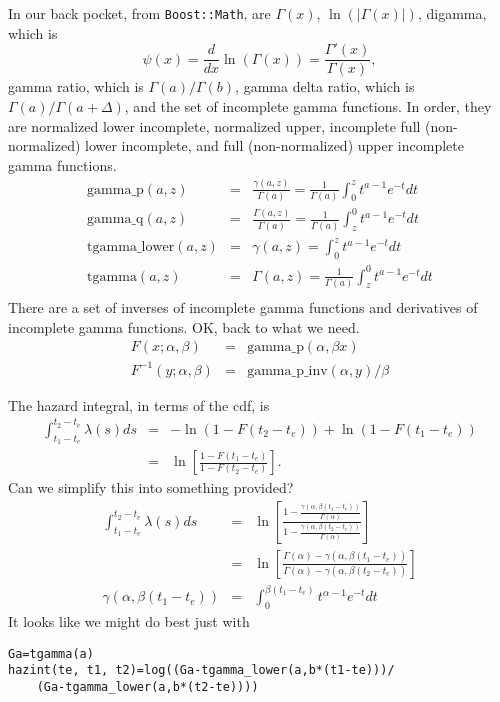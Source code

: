 \documentclass{article}
\begin{document}
In our back pocket, from \texttt{Boost::Math}, are
$\Gamma(x)$, $\ln(|\Gamma(x)|)$, digamma, which is
\begin{equation}
  \psi(x)=\frac{d}{dx}\ln(\Gamma(x))=\frac{\Gamma'(x)}{\Gamma(x)},
\end{equation}
gamma ratio, which is $\Gamma(a)/\Gamma(b)$,
gamma delta ratio, which is $\Gamma(a)/\Gamma(a+\Delta)$,
and the set of incomplete gamma functions.
In order, they are normalized lower incomplete, normalized upper, incomplete
full (non-normalized) lower incomplete, and full (non-normalized)
upper incomplete gamma functions.
\begin{eqnarray}
  \mbox{gamma\_p}(a,z)&=&\frac{\gamma(a,z)}{\Gamma(a)}=\frac{1}{\Gamma(a)}
     \int_0^zt^{a-1}e^{-t}dt \\
  \mbox{gamma\_q}(a,z)&=&\frac{\Gamma(a,z)}{\Gamma(a)}=\frac{1}{\Gamma(a)}
     \int_z^0t^{a-1}e^{-t}dt \\
  \mbox{tgamma\_lower}(a,z)&=&\gamma(a,z)=
     \int_0^zt^{a-1}e^{-t}dt \\
  \mbox{tgamma}(a,z)&=&\Gamma(a,z)=\frac{1}{\Gamma(a)}
     \int_z^0t^{a-1}e^{-t}dt \\
\end{eqnarray}
There are a set of inverses of incomplete gamma functions
and derivatives of incomplete gamma functions.
OK, back to what we need.
\begin{eqnarray}
  F(x;\alpha,\beta)&=&\mbox{gamma\_p}(\alpha, \beta x) \\
  F^{-1}(y;\alpha,\beta)&=&\mbox{gamma\_p\_inv}(\alpha, y)/\beta
\end{eqnarray}

The hazard integral, in terms of the cdf, is
\begin{eqnarray}
 \int_{t_1-t_e}^{t_2-t_e}\lambda(s)ds&=&-\ln(1-F(t_2-t_e))+\ln(1-F(t_1-t_e)) \\
 &=& \ln\left[\frac{1-F(t_1-t_e)}{1-F(t_2-t_e)}\right].
\end{eqnarray}
Can we simplify this into something provided?
\begin{eqnarray}
\int_{t_1-t_e}^{t_2-t_e}\lambda(s)ds & = & \ln\left[\frac{1-\frac{\gamma(\alpha,\beta (t_1-t_e))}{\Gamma(\alpha)}}{1-\frac{\gamma(\alpha,\beta (t_2-t_e))}{\Gamma(\alpha)}}\right] \\
 & = & \ln\left[\frac{\Gamma(\alpha)-\gamma(\alpha,\beta (t_1-t_e))}
 {\Gamma(\alpha)-\gamma(\alpha,\beta (t_2-t_e))} \right] \\
\gamma(\alpha,\beta (t_1-t_e)) & = & \int_0^{\beta(t_1-t_e)} t^{\alpha-1}e^{-t}dt
\end{eqnarray}
It looks like we might do best just with
\begin{lstlisting}
Ga=tgamma(a)
hazint(te, t1, t2)=log((Ga-tgamma_lower(a,b*(t1-te)))/
    (Ga-tgamma_lower(a,b*(t2-te))))
\end{lstlisting}
\end{document}
